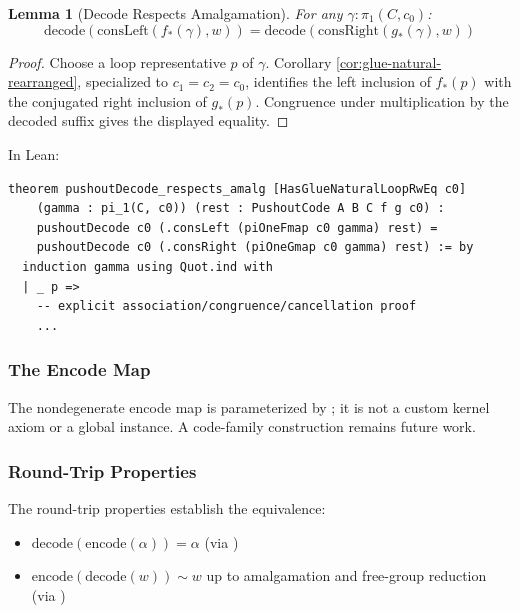 \documentclass{lmcs}
\theoremstyle{definition}
\theoremstyle{plain}
\newtheorem{lemma}[definition]{Lemma}
\theoremstyle{remark}
\newcommand{\piOne}{\pi_1}
\newcommand{\decode}{\mathrm{decode}}
\newcommand{\encode}{\mathrm{encode}}
\begin{document}
\begin{lemma}[Decode Respects Amalgamation]
\label{lem:decode-amalg}
For any $\gamma : \piOne(C, c_0)$:
\[
\decode(\mathrm{consLeft}(f_*(\gamma), w)) = \decode(\mathrm{consRight}(g_*(\gamma), w))
\]
\end{lemma}

\begin{proof}
Choose a loop representative \(p\) of \(\gamma\).  Corollary
\ref{cor:glue-natural-rearranged}, specialized to \(c_1=c_2=c_0\), identifies
the left inclusion of \(f_*(p)\) with the conjugated right inclusion of
\(g_*(p)\).  Congruence under multiplication by the decoded suffix gives the
displayed equality.
\end{proof}

In Lean:
\begin{lstlisting}
theorem pushoutDecode_respects_amalg [HasGlueNaturalLoopRwEq c0]
    (gamma : pi_1(C, c0)) (rest : PushoutCode A B C f g c0) :
    pushoutDecode c0 (.consLeft (piOneFmap c0 gamma) rest) =
    pushoutDecode c0 (.consRight (piOneGmap c0 gamma) rest) := by
  induction gamma using Quot.ind with
  | _ p =>
    -- explicit association/congruence/cancellation proof
    ...
\end{lstlisting}

\subsubsection{The Encode Map}

The nondegenerate encode map is parameterized by
; it is not a custom
kernel axiom or a global
instance.  A code-family construction remains future work.

\subsubsection{Round-Trip Properties}

The round-trip properties establish the equivalence:
\begin{itemize}
    \item $\decode(\encode(\alpha)) = \alpha$ (via
    )
    \item $\encode(\decode(w)) \sim w$ up to amalgamation and free-group
    reduction (via
    )
\end{itemize}

\end{document}
